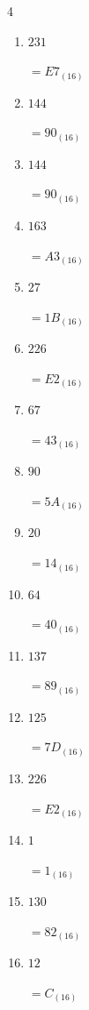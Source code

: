 \begin{multicols}{4}
\begin{enumerate}
        $=28_{(16)}$

  \item $231$

        $=E7_{(16)}$

  \item $144$

        $=90_{(16)}$

  \item $144$

        $=90_{(16)}$

  \item $163$

        $=A3_{(16)}$

  \item $27$

        $=1B_{(16)}$

\columnbreak %

  \item $226$

        $=E2_{(16)}$

  \item $67$

        $=43_{(16)}$

  \item $90$

        $=5A_{(16)}$

  \item $20$

        $=14_{(16)}$

  \item $64$

        $=40_{(16)}$

  \item $137$

        $=89_{(16)}$

  \item $125$

        $=7D_{(16)}$

  \item $226$

        $=E2_{(16)}$

  \item $1$

        $=1_{(16)}$

  \item $130$

        $=82_{(16)}$

  \item $12$

        $=C_{(16)}$


\end{enumerate}
\end{multicols}
